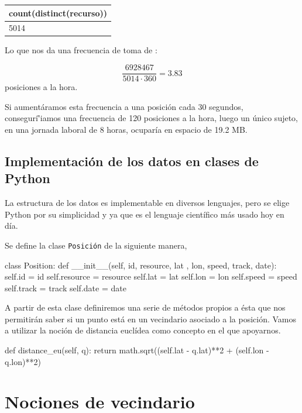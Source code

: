 \documentclass[a4paper, 12pt]{article}
\begin{document}
\begin{center}
 \begin{tabular}{|l|}
 \hline
	count(distinct(recurso)) \\
 \hline
	5014 \\
 \hline
 
 \end{tabular}
\end{center}


Lo que nos da una frecuencia de toma de :

$$ \frac{6928467}{5014 \cdot 360} = 3.83$$ posiciones a la hora.

Si aument\'aramos esta frecuencia a una posici\'on cada 30 segundos, conseguri\r'iamos una frecuencia de 120 posiciones a la hora, luego un \'unico sujeto, en una jornada laboral de 8 horas, ocupar\'ia en espacio de 19.2 MB. 

\subsection{Implementaci\'on de los datos en clases de Python}\label{sec:positionClass}

La estructura de los datos es implementable en diversos lenguajes, pero se elige Python por su simplicidad y ya que es el lenguaje cient\'ifico m\'as usado hoy en d\'ia.

Se define la clase \texttt{Posici\'on} de la siguiente manera,

\begin{python}
class Position:
    def __init__(self, id, resource, lat
    		    , lon, speed, track, date):
        self.id = id
        self.resource = resource
        self.lat = lat
        self.lon = lon
        self.speed = speed
        self.track = track
        self.date = date
\end{python}

A partir de esta clase definiremos una serie de m\'etodos propios a \'esta que nos permitir\'an saber si un punto est\'a en un vecindario asociado a la posici\'on. Vamos a utilizar la noci\'on de distancia eucl\'idea como concepto en el que apoyarnos.\\

\begin{python}
        def distance_eu(self, q):
                return math.sqrt((self.lat - q.lat)**2 
                	+ (self.lon - q.lon)**2)
\end{python}


\pagebreak
\section{Nociones de vecindario}
\end{document}
